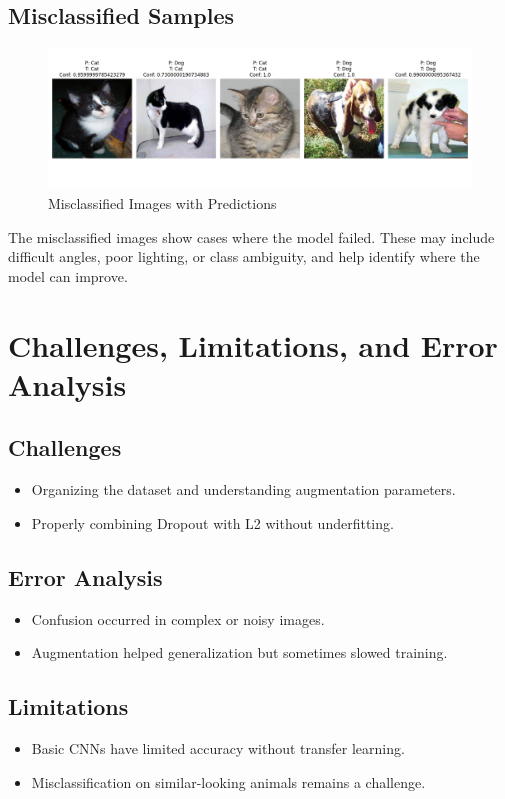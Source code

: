 \documentclass{article}
\begin{document}
\subsection*{Misclassified Samples}
\begin{figure}[H]
\centering
\includegraphics[width=0.9\linewidth]{misclassified_samples.png}
\caption{Misclassified Images with Predictions}
\end{figure}

The misclassified images show cases where the model failed. These may include difficult angles, poor lighting, or class ambiguity, and help identify where the model can improve.

\section{Challenges, Limitations, and Error Analysis}

\subsection{Challenges}
\begin{itemize}
    \item Organizing the dataset and understanding augmentation parameters.
    \item Properly combining Dropout with L2 without underfitting.
\end{itemize}

\subsection{Error Analysis}
\begin{itemize}
    \item Confusion occurred in complex or noisy images.
    \item Augmentation helped generalization but sometimes slowed training.
\end{itemize}

\subsection{Limitations}
\begin{itemize}
    \item Basic CNNs have limited accuracy without transfer learning.
    \item Misclassification on similar-looking animals remains a challenge.
\end{itemize}
\end{document}
